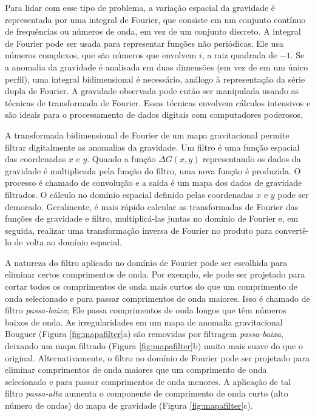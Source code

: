 \documentclass[]{book}
\theoremstyle{definition}
\theoremstyle{definition}
\theoremstyle{definition}
\theoremstyle{remark}
\begin{document}
Para lidar com esse tipo de problema, a variação espacial da gravidade é representada por uma integral de Fourier, que consiste em um conjunto contínuo de frequências ou números de onda, em vez de um conjunto discreto. A integral de Fourier pode ser usada para representar funções não periódicas. Ele usa números complexos, que são números que envolvem \(i\), a raiz quadrada de \(-1\). Se a anomalia da gravidade é analisada em duas dimensões (em vez de em um único perfil), uma integral bidimensional é necessário, análogo à representação da série dupla de Fourier. A gravidade observada pode então ser manipulada usando as técnicas de transformada de Fourier. Essas técnicas envolvem cálculos intensivos e são ideais para o processamento de dados digitais com computadores poderosos.

A transformada bidimensional de Fourier de um mapa gravitacional permite filtrar digitalmente as anomalias da gravidade. Um filtro é uma função espacial das coordenadas \(x\) e \(y\). Quando a função \(\Delta G (x, y)\) representando os dados da gravidade é multiplicada pela função do filtro, uma nova função é produzida. O processo é chamado de convolução e a saída é um mapa dos dados de gravidade filtrados. O cálculo no domínio espacial definido pelas coordenadas \(x\) e \(y\) pode ser demorado. Geralmente, é mais rápido calcular as transformadas de Fourier das funções de gravidade e filtro, multiplicá-las juntas no domínio de Fourier e, em seguida, realizar uma transformação inversa de Fourier no produto para convertê-lo de volta ao domínio espacial.

A natureza do filtro aplicado no domínio de Fourier pode ser escolhida para eliminar certos comprimentos de onda. Por exemplo, ele pode ser projetado para cortar todos os comprimentos de onda mais curtos do que um comprimento de onda selecionado e para passar comprimentos de onda maiores. Isso é chamado de filtro \emph{passa-baixa}; Ele passa comprimentos de onda longos que têm números baixos de onda. As irregularidades em um mapa de anomalia gravitacional Bouguer (Figura \ref{fig:mapafilter}a) são removidas por filtragem \emph{passa-baixa}, deixando um mapa filtrado (Figura \ref{fig:mapafilter}b) muito mais suave do que o original. Alternativamente, o filtro no domínio de Fourier pode ser projetado para eliminar comprimentos de onda maiores que um comprimento de onda selecionado e para passar comprimentos de onda menores. A aplicação de tal filtro \emph{passa-alta} aumenta o componente de comprimento de onda curto (alto número de ondas) do mapa de gravidade (Figura \ref{fig:mapafilter}c).
\end{document}

